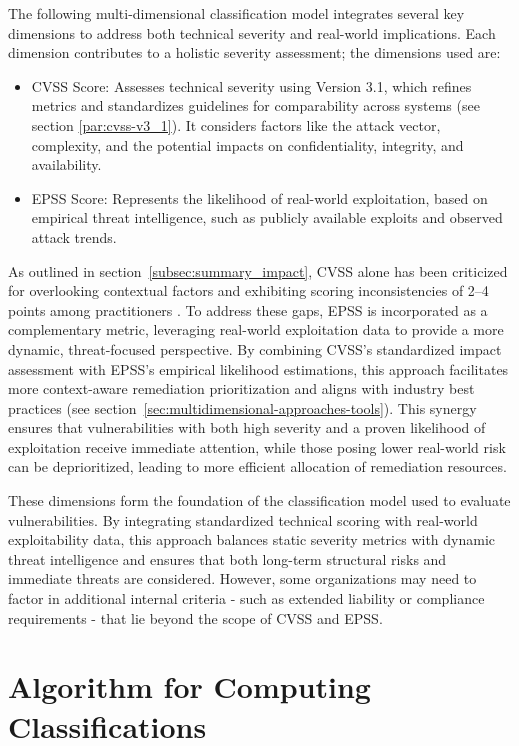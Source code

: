 The following multi-dimensional classification model integrates several key dimensions to address both technical severity and real-world implications. Each dimension contributes to a holistic severity assessment; the dimensions used are:

\begin{itemize}
    \item \ac{CVSS} Score: Assesses technical severity using Version 3.1, which refines metrics and standardizes guidelines for comparability across systems (see section \ref{par:cvss-v3_1}). It considers factors like the attack vector, complexity, and the potential impacts on confidentiality, integrity, and availability.
    \item \ac{EPSS} Score: Represents the likelihood of real-world exploitation, based on empirical threat intelligence, such as publicly available exploits and observed attack trends.
\end{itemize}

As outlined in section~\ref{subsec:summary_impact}, \ac{CVSS} alone has been criticized for overlooking contextual factors and exhibiting scoring inconsistencies of 2--4 points among practitioners \autocite{spring_time_2021}. To address these gaps, \ac{EPSS} is incorporated as a complementary metric, leveraging real-world exploitation data to provide a more dynamic, threat-focused perspective. By combining \ac{CVSS}'s standardized impact assessment with \ac{EPSS}'s empirical likelihood estimations, this approach facilitates more context-aware remediation prioritization and aligns with industry best practices (see section~\ref{sec:multidimensional-approaches-tools}). This synergy ensures that vulnerabilities with both high severity and a proven likelihood of exploitation receive immediate attention, while those posing lower real-world risk can be deprioritized, leading to more efficient allocation of remediation resources.

These dimensions form the foundation of the classification model used to evaluate vulnerabilities. By integrating standardized technical scoring with real-world exploitability data, this approach balances static severity metrics with dynamic threat intelligence and ensures that both long-term structural risks and immediate threats are considered. However, some organizations may need to factor in additional internal criteria - such as extended liability or compliance requirements - that lie beyond the scope of \ac{CVSS} and \ac{EPSS}.

\section{Algorithm for Computing Classifications}
\label{sec:algorithm-classifications}

